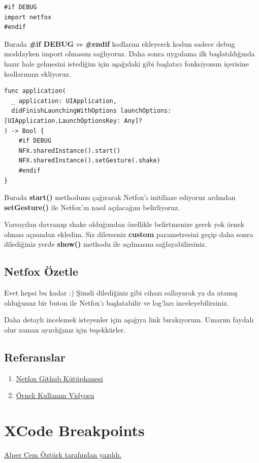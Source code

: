 \documentclass[24pt]{article}
\begin{document}
\begin{listing}[htbp]
\begin{verbatim}
#if DEBUG
import netfox
#endif
\end{verbatim}
\caption{Netfox Import}
\end{listing}

Burada  \textbf{\textbf{\#if DEBUG}} ve \textbf{\textbf{\#endif}} kodlarını ekleyerek kodun sadece debug moddayken import olmasını sağlıyoruz. Daha sonra uygulama ilk başlatıldığında hazır hale gelmesini istediğim için aşağıdaki gibi başlatıcı fonksiyonun içerisine kodlarımızı ekliyoruz.

\begin{listing}[htbp]
\begin{verbatim}
func application(
  _ application: UIApplication,
  didFinishLaunchingWithOptions launchOptions: [UIApplication.LaunchOptionsKey: Any]?
) -> Bool {
    #if DEBUG
    NFX.sharedInstance().start()
    NFX.sharedInstance().setGesture(.shake)
    #endif
}
\end{verbatim}
\caption{Netfox başlatma}
\end{listing}

Burada \textbf{\textbf{start()}} methodunu çağırarak Netfox'ı initiliaze ediyoruz ardından \textbf{\textbf{setGesture()}} ile Netfox'ın nasıl açılacağını belirliyoruz.

Varsayılan davranışı shake olduğundan özellikle belirtmenize gerek yok örnek olması açısından ekledim. Siz dilerseniz \textbf{\textbf{custom}} parametresini geçip daha sonra dilediğiniz yerde \textbf{\textbf{show()}} methodu ile açılmasını sağlayabilirsiniz.

\subsection{Netfox Özetle}
\label{sec:orgae9b24e}
Evet hepsi bu kadar :) Şimdi dilediğiniz gibi cihazı sallayarak ya da atamış olduğunuz bir buton ile Netfox'ı başlatabilir ve log'ları inceleyebilirsiniz.

Daha detaylı incelemek isteyenler için aşağıya link bırakıyorum. Umarım faydalı olur zaman ayırdığınız için teşekkürler.

\subsection{Referanslar}
\label{sec:org2d8949f}
\begin{enumerate}
\item \href{https://github.com/kasketis/netfox}{Netfox Github Kütüphanesi}
\item \href{https://raw.githubusercontent.com/kasketis/netfox/master/assets/overview1\_5\_3.gif}{Örnek Kullanım Vidyosu}
\end{enumerate}

\newpage
\thispagestyle{empty}

\section{XCode Breakpoints}
\label{sec:org987cf70}
\uline{\href{https://tr.linkedin.com/in/alper-cem-\%C3\%B6zt\%C3\%BCrk-a625671a8}{Alper Cem Öztürk} tarafından yazıldı.}
\end{document}
